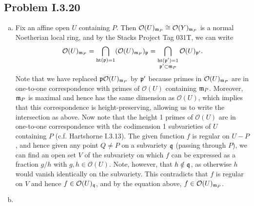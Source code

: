 \documentclass{mathnotes}
\begin{document}
\subsection*{Problem I.3.20}
\begin{enumerate}[(a)]
    \item Fix an affine open $U$ containing $P$. Then $\mathcal{O}(U)_{\mathfrak m_P}\cong \mathcal{O}(Y)_{\mathfrak m_P}$
        is a normal Noetherian local ring, and by the Stacks Project Tag 031T, we can write
        \[ \mathcal{O}(U)_{\mathfrak m_P}=\bigcap_{\textrm{ht}(\mathfrak p)=1}(\mathcal{O}(U)_{\mathfrak m_P})_{\mathfrak p}=\bigcap_{\substack{\textrm{ht}(\mathfrak p')=1\\\mathfrak p'\subset \mathfrak m_P}}\mathcal{O}(U)_{\mathfrak p'}.\]
        Note that we have replaced $\mathfrak p\mathcal{O}(U)_{\mathfrak m_P}$ by $\mathfrak p'$ because primes in
        $\mathcal{O}(U)_{\mathfrak m_P}$ are in one-to-one correspondence with primes of $\mathcal{O}(U)$
        containing $\mathfrak m_P$. Moreover, $\mathfrak m_P$ is maximal and hence
        has the same dimension as $\mathcal{O}(U)$, which implies that this correspondence is
        height-preserving, allowing us to write the intersection as above. Now note that the height 1
        primes of $\mathcal{O}(U)$ are in one-to-one correspondence with the codimension 1
        subvarieties of $U$ containing $P$ (c.f. Hartshorne I.3.13). The given function $f$
        is regular on $U-P$, and hence given any point $Q\neq P$ on a subvariety $\mathfrak q$ (passing
        through $P$), we can find
        an open set $V$ of the subvariety on which $f$ can be expressed as a fraction $g/h$ with
        $g,h\in \mathcal{O}(U)$. Note, however, that $h\notin\mathfrak q$, as otherwise $h$ would
        vanish identically on the subvariety. This contradicts that $f$ is regular on $V$
        and hence $f\in\mathcal{O}(U)_{\mathfrak q}$, and by the equation above, $f\in\mathcal{O}(U)_{\mathfrak m_P}$.
    \item
\end{enumerate}
\end{document}
